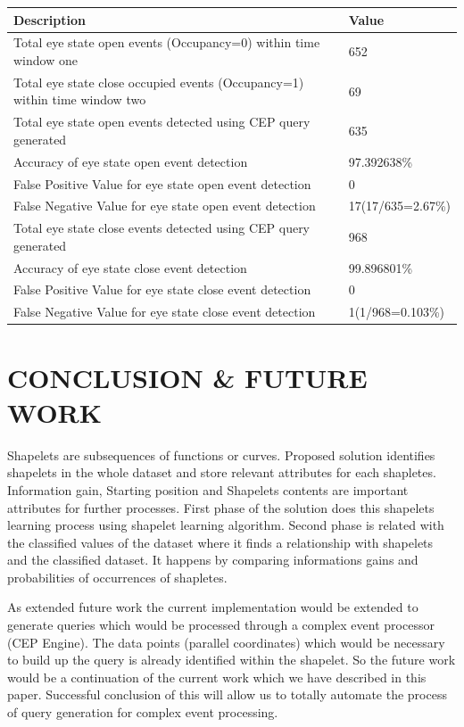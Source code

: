 \documentclass[letterpaper, 10 pt, conference]{IEEEtran}  %
\begin{document}
\begin{center}
\begin{tabular}{ | m{6cm} | m{2.3cm}| } 
 \hline 
\textbf{Description} & \textbf{Value}\\
\hline
Total eye state open events (Occupancy=0) within time window one & 652\\
\hline
Total eye state close occupied events (Occupancy=1) within time window two & 69\\
\hline
Total eye state open events detected using CEP query generated & 635\\
\hline
Accuracy of eye state open event detection & 97.392638\%\\
\hline
False Positive Value for eye state open event detection & 0\\
\hline
False Negative Value for eye state open event detection & 17\newline(17/635=2.67\%)\\
\hline
Total eye state close events detected using CEP query generated & 968\\
\hline
Accuracy of eye state close event detection & 99.896801\%\\
\hline
False Positive Value for eye state close event detection & 0\\
\hline
False Negative Value for eye state close event detection & 1\newline(1/968=0.103\%)\\
\hline

\end{tabular}
\end{center}

\section{CONCLUSION \& FUTURE WORK}

Shapelets are subsequences of functions or curves. Proposed solution identifies shapelets in the whole dataset and store relevant attributes for each shapletes. Information gain, Starting position and Shapelets contents are important attributes for further processes. First phase of the solution does this shapelets learning process using shapelet learning algorithm. Second phase is related with the classified values of the dataset where it finds a relationship with shapelets and the classified dataset. It happens by comparing informations gains and probabilities of occurrences of shapletes. 

As extended future work the current implementation would be extended to generate queries which would be processed through a complex event processor (CEP Engine). The data points (parallel coordinates) which would be necessary to build up the query is already identified within the shapelet. So the future work would be a continuation of the current work which we have described in this paper. Successful conclusion of this will allow us to totally automate the process of query generation for complex event processing. 
\end{document}
